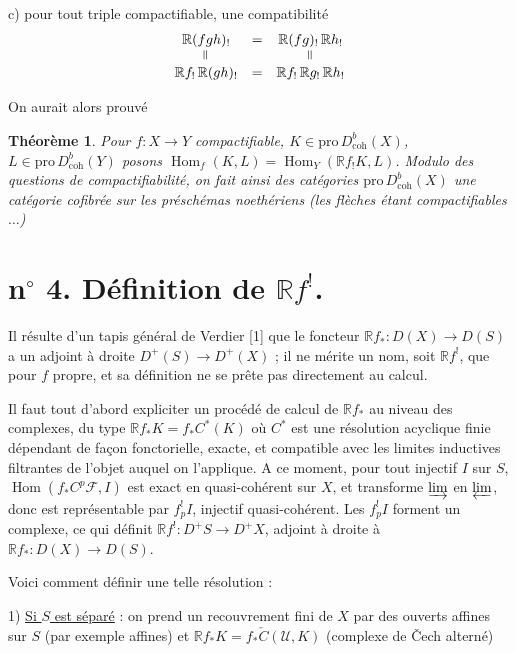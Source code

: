 \documentclass[12pt]{amsart}
\theoremstyle{plain}
\newtheorem{thm}{Théorème}
\theoremstyle{definition}
\DeclareMathOperator{\Hom}{Hom}
\newcommand{\Pro}{\text{pro}\,}
\newcommand{\coh}{\text{coh}}
\newcommand{\cF}{\mathcal{F}}
\newcommand{\cU}{\mathcal{U}}
\newcommand{\cDb}{D^{b}}
\newcommand{\cD}{D}
\newcommand{\bR}{\mathbb{R}}
\begin{document}
c) pour tout triple compactifiable, une compatibilit\'e
\[
\begin{array}{ccc}
\bR(fgh)_{!} & = & \bR(fg)_{!}\,\bR h_{!} \\
\rotatebox{90}{$=$} & & \rotatebox{90}{$=$} \\
\bR f_{!}\,\bR(gh)_{!} & = & \bR f_{!}\,\bR g_{!}\,\bR h_{!}
\end{array}
\]

On aurait alors prouv\'e

\begin{thm}
Pour $f: X \to Y$ compactifiable, $K \in \Pro\cDb_{\coh}(X)$, $L \in \Pro\cDb_{\coh}(Y)$ posons $\Hom_{f}(K,L) = \Hom_{Y}(\bR f_{!}K, L)$. Modulo des questions de compactifiabilit\'e, on fait ainsi des cat\'egories $\Pro\cDb_{\coh}(X)$ une cat\'egorie cofibr\'ee sur les pr\'esch\'emas noeth\'eriens (les fl\`eches \'etant compactifiables $\ldots$)
\end{thm}

\section*{n$^{\circ}$ 4. D\'efinition de $\bR f^{!}$.}

Il r\'esulte d'un tapis g\'en\'eral de Verdier [1] que le foncteur $\bR f_{*}: \cD(X) \to \cD(S)$ a un adjoint \`a droite $\cD^{+}(S) \to \cD^{+}(X)$ ; il ne m\'erite un nom, soit $\bR f^{!}$, que pour $f$ propre, et sa d\'efinition ne se pr\^ete pas directement au calcul.

Il faut tout d'abord expliciter un proc\'ed\'e de calcul de $\bR f_{*}$ au niveau des complexes, du type $\bR f_{*}K = f_{*}C^{*}(K)$ o\`u $C^{*}$ est une r\'esolution acyclique finie d\'ependant de fa\c{c}on fonctorielle, exacte, et compatible avec les limites inductives filtrantes de l'objet auquel on l'applique. A ce moment, pour tout injectif $I$ sur $S$, $\Hom(f_{*}C^{p}\cF, I)$ est exact en quasi-coh\'erent sur $X$, et transforme $\varinjlim$ en $\varprojlim$, donc est repr\'esentable par $f_{p}^{!}I$, injectif quasi-coh\'erent. Les $f_{p}^{!}I$ forment un complexe, ce qui d\'efinit $\bR f^{!}: \cD^{+}S \to \cD^{+}X$, adjoint \`a droite \`a $\bR f_{*}: \cD(X) \to \cD(S)$.

Voici comment d\'efinir une telle r\'esolution :

1) \underline{Si $S$ est s\'epar\'e} : on prend un recouvrement fini de $X$ par des ouverts affines sur $S$ (par exemple affines) et $\bR f_{*}K = f_{*}\check{C}(\cU, K)$ (complexe de \v{C}ech altern\'e)
\end{document}
